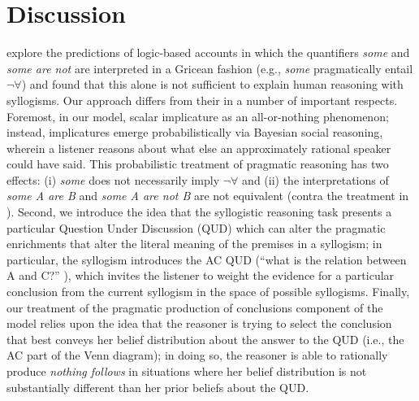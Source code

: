 \documentclass[floatsintext, doc]{apa6}
\begin{document}




\section{Discussion}

 explore the predictions of logic-based accounts in which the quantifiers \emph{some} and \emph{some are not} are interpreted in a Gricean fashion (e.g., \emph{some} pragmatically entail $\neg \forall$) and found that this alone is not sufficient to explain human reasoning with syllogisms. 
Our approach differs from their in a number of important respects.
Foremost, in our model, scalar implicature as an all-or-nothing phenomenon; instead, implicatures emerge probabilistically via Bayesian social reasoning, wherein a listener reasons about what else an approximately rational speaker could have said. 
This probabilistic treatment of pragmatic reasoning has two effects: (i) \emph{some} does not necessarily imply $\neg \forall$ and (ii) the interpretations of \emph{some A are B} and \emph{some A are not B} are not equivalent (contra the treatment in ).
Second, we introduce the idea that the syllogistic reasoning task presents a particular Question Under Discussion (QUD) which can alter the pragmatic enrichments that alter the literal meaning of the premises in a syllogism; in particular, the syllogism introduces the \textsc{AC} QUD (``what is the relation between A and C?'' ), which invites the listener to weight the evidence for a particular conclusion from the current syllogism in the space of possible syllogisms. 
Finally, our treatment of the pragmatic production of conclusions component of the model relies upon the idea that the reasoner is trying to select the conclusion that best conveys her belief distribution about the answer to the QUD (i.e., the AC part of the Venn diagram); in doing so, the reasoner is able to rationally produce \emph{nothing follows} in situations where her belief distribution is not substantially different than her prior beliefs about the QUD. 



\newpage



\end{document}
